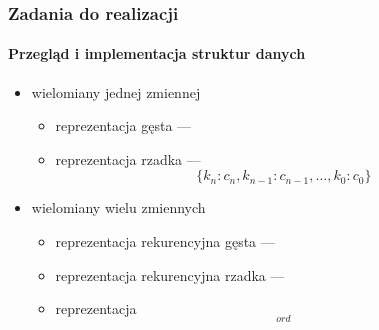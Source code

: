 \documentclass{beamer}
\begin{document}
\begin{frame}
    \frametitle{Zadania do realizacji}
    \framesubtitle{Przegląd i implementacja struktur danych}

    \begin{itemize}
        \item wielomiany jednej zmiennej
            \begin{itemize}
                \item reprezentacja gęsta --- 
                    \begin{equation*}
                        [c_n, c_{n-1}, \ldots, c_1, c_0]
                    \end{equation*}
                \item reprezentacja rzadka --- 
                    \begin{equation*}
                        \{k_n: c_n, k_{n-1}: c_{n-1}, \ldots, k_0: c_0\}
                    \end{equation*}
            \end{itemize}
        \pause
        \item wielomiany wielu zmiennych
            \begin{itemize}
                \item reprezentacja rekurencyjna gęsta --- 
                \item reprezentacja rekurencyjna rzadka --- 
                \item reprezentacja 
                    \begin{equation*}
                        [(M_n, c_n), (M_{n-1}, c_{n-1}) \ldots, (M_0, c_0)]_{ord}
                    \end{equation*}
            \end{itemize}
    \end{itemize}
\end{frame}
\end{document}
